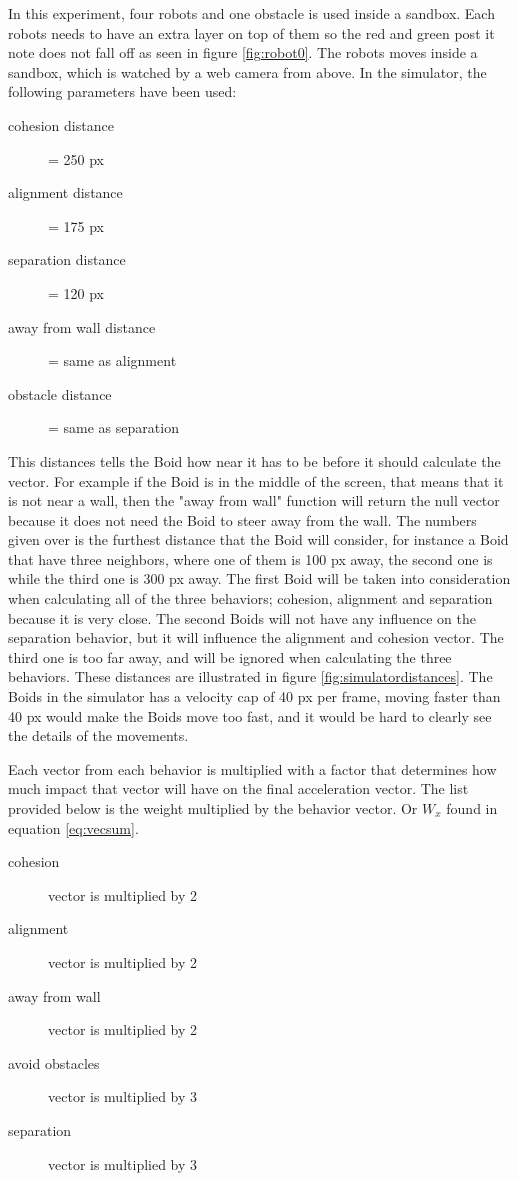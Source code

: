 In this experiment, four robots and one obstacle is used inside a sandbox. Each robots needs to have an extra layer on top of them so the red and green post it note does not fall off as seen in figure \ref{fig:robot0}. The robots moves inside a sandbox, which is watched by a web camera from above.
In the simulator, the following parameters have been used:
\begin{description}
\item[cohesion distance] = 250 px
\item[alignment distance] = 175 px
\item[separation distance] = 120 px
\item[away from wall distance] = same as alignment
\item[obstacle distance] = same as separation
\end{description}
This distances tells the Boid how near it has to be before it should calculate the vector. For example if the Boid is in the middle of the screen, that means that it is not near a wall, then the "away from wall" function will return the null vector because it does not need the Boid to steer away from the wall.
The numbers given over is the furthest distance that the Boid will consider, for instance a Boid that have three neighbors, where one of them is 100 px away, the second one is  while the third one is 300 px away. The first Boid will be taken into consideration when calculating all of the three behaviors; cohesion, alignment and separation because it is very close. The second Boids will not have any influence on the separation behavior, but it will influence the alignment and cohesion vector. The third one is too far away, and will be ignored when calculating the three behaviors. These distances are illustrated in figure \ref{fig:simulatordistances}.
The Boids in the simulator has a velocity cap of 40 px per frame, moving faster than 40 px would make the Boids move too fast, and it would be hard to clearly see the details of the movements. 

Each vector from each behavior is multiplied with a factor that determines how much impact that vector will have on the final acceleration vector.
The list provided below is the weight multiplied by the behavior vector. Or $W_x$ found in equation \ref{eq:vecsum}.
\begin{description}
\item[cohesion] vector is multiplied by 2
\item[alignment] vector is multiplied by 2
\item[away from wall] vector is multiplied by 2
\item[avoid obstacles] vector is multiplied by 3
\item[separation] vector is multiplied by 3
\end{description}

